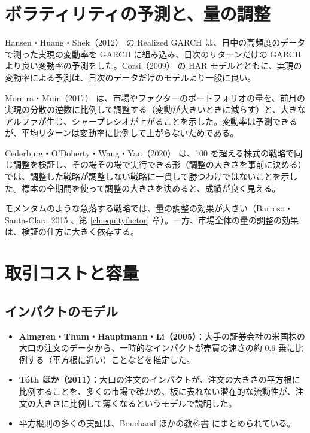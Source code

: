 \section{ボラティリティの予測と、量の調整}

Hansen・Huang・Shek（2012）\cite{hhs2012} の Realized GARCH は、日中の高頻度のデータで測った実現の変動率を GARCH に組み込み、日次のリターンだけの GARCH より良い変動率の予測をした。Corsi（2009）\cite{corsi2009} の HAR モデルとともに、実現の変動率による予測は、日次のデータだけのモデルより一般に良い。

\begin{paperbox}
Moreira・Muir（2017）\cite{moreiramuir2017} は、市場やファクターのポートフォリオの量を、前月の実現の分散の逆数に比例して調整する（変動が大きいときに減らす）と、大きなアルファが生じ、シャープレシオが上がることを示した。変動率は予測できるが、平均リターンは変動率に比例して上がらないためである。

Cederburg・O'Doherty・Wang・Yan（2020）\cite{cederburg2020} は、100 を超える株式の戦略で同じ調整を検証し、その場その場で実行できる形（調整の大きさを事前に決める）では、調整した戦略が調整しない戦略に一貫して勝つわけではないことを示した。標本の全期間を使って調整の大きさを決めると、成績が良く見える。
\end{paperbox}

モメンタムのような急落する戦略では、量の調整の効果が大きい（Barroso・Santa-Clara 2015 \cite{barroso2015}、第 \ref{ch:equityfactor} 章）。一方、市場全体の量の調整の効果は、検証の仕方に大きく依存する。

\section{取引コストと容量}

\subsection{インパクトのモデル}

\begin{itemize}
\item \textbf{Almgren・Thum・Hauptmann・Li（2005）}\cite{athl2005}：大手の証券会社の米国株の大口の注文のデータから、一時的なインパクトが売買の速さの約 0.6 乗に比例する（平方根に近い）ことなどを推定した。
\item \textbf{Tóth ほか（2011）}\cite{toth2011}：大口の注文のインパクトが、注文の大きさの平方根に比例することを、多くの市場で確かめ、板に表れない潜在的な流動性が、注文の大きさに比例して薄くなるというモデルで説明した。
\item 平方根則の多くの実証は、Bouchaud ほかの教科書 \cite{bouchaud2018} にまとめられている。
\end{itemize}

